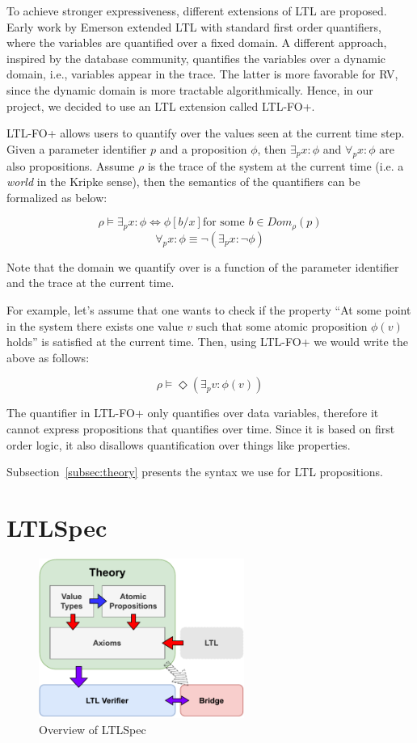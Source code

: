 \documentclass[format=acmsmall, nonacm=true, review=true, screen=true]{acmart}
\newcommand{\mycaption}[1]{\Description{#1}\caption{#1}}
\begin{document}
To achieve stronger expressiveness, different extensions of LTL are proposed. Early work by Emerson \cite{emerson1990temporal} extended LTL with standard first order quantifiers, where the variables are quantified over a fixed domain. A different approach, inspired by the database community, quantifies the variables over a dynamic domain, i.e., variables appear in the trace. The latter is more favorable for RV, since the dynamic domain is more tractable algorithmically. Hence, in our project, we decided to use an LTL extension called LTL-FO+.

LTL-FO+ allows users to quantify over the values seen at the current time step. Given a parameter identifier $p$ and a proposition $\phi$, then $\exists_{p} x : \phi$ and $\forall_{p} x:\phi$ are also propositions. Assume $\rho$ is the trace of the system at the current time (i.e. a \textit{world} in the Kripke sense), then the semantics of the quantifiers can be formalized as below:

$$\rho\vDash \exists_p x:\phi \Leftrightarrow \phi[b/x] \text{for some }b\in Dom_{\rho}(p)$$
$$\forall_{p} x : \phi \equiv \lnot(\exists_{p}x: \lnot\phi)$$

Note that the domain we quantify over is a function of the parameter identifier and the trace at the current time.

For example, let's assume that one wants to check if the property “At some point in the system there exists one value $v$ such that some atomic proposition $\phi(v)$ holds” is satisfied at the current time. Then, using LTL-FO+ we would write the above as follows:

$$ \rho \vDash \Diamond(\exists_{p} v :\phi(v)) $$

The quantifier in LTL-FO+ only quantifies over data variables, therefore it cannot express propositions that quantifies over time. Since it is based on first order logic, it also disallows quantification over things like properties.

Subsection~\ref{subsec:theory} presents the syntax we use for LTL propositions.

\section{LTLSpec}

\begin{figure}[h]
  \includegraphics[width=0.6\textwidth]{images/ltlspec-overview.pdf}
  \centering
  \mycaption{Overview of LTLSpec}
  \label{fig:overview}
\end{figure}
\end{document}
